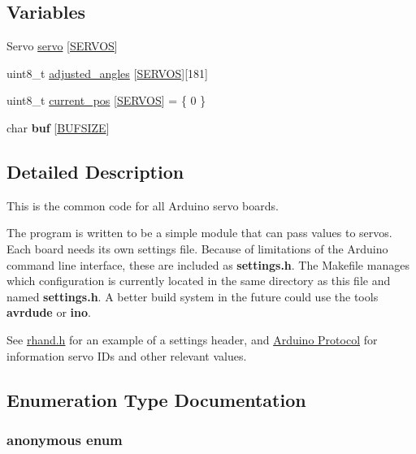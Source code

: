 \subsection*{Variables}
\begin{DoxyCompactItemize}
\item 
Servo \hyperlink{servo_8ino_adf02be48d17da3f4a229ebfdfda2fa71}{servo} \mbox{[}\hyperlink{rhand_8h_a7baed4559391f95790fea2b456a22b68}{S\+E\+R\+V\+O\+S}\mbox{]}
\item 
uint8\+\_\+t \hyperlink{servo_8ino_afb7b19d5ec5c1046df4a261ca4ee9f70}{adjusted\+\_\+angles} \mbox{[}\hyperlink{rhand_8h_a7baed4559391f95790fea2b456a22b68}{S\+E\+R\+V\+O\+S}\mbox{]}\mbox{[}181\mbox{]}
\item 
uint8\+\_\+t \hyperlink{servo_8ino_ae88c6e452cc6a2dc7af59897c42d8e1e}{current\+\_\+pos} \mbox{[}\hyperlink{rhand_8h_a7baed4559391f95790fea2b456a22b68}{S\+E\+R\+V\+O\+S}\mbox{]} = \{ 0 \}
\item 
\hypertarget{servo_8ino_ac95651d79c608a3148973b5b1fc9e525}{}char {\bfseries buf} \mbox{[}\hyperlink{rhand_8h_aeca034f67218340ecb2261a22c2f3dcd}{B\+U\+F\+S\+I\+Z\+E}\mbox{]}\label{servo_8ino_ac95651d79c608a3148973b5b1fc9e525}

\end{DoxyCompactItemize}


\subsection{Detailed Description}
This is the common code for all Arduino servo boards.

The program is written to be a simple module that can pass values to servos. Each board needs its own settings file. Because of limitations of the Arduino command line interface, these are included as {\bfseries settings.\+h}. The Makefile manages which configuration is currently located in the same directory as this file and named {\bfseries settings.\+h}. A better build system in the future could use the tools {\bfseries avrdude} or {\bfseries ino}.

See \hyperlink{rhand_8h}{rhand.\+h} for an example of a settings header, and \hyperlink{index_Arduino}{Arduino Protocol} for information servo I\+Ds and other relevant values. 

\subsection{Enumeration Type Documentation}
\hypertarget{servo_8ino_a06fc87d81c62e9abb8790b6e5713c55b}{}\subsubsection[{anonymous enum}]{\setlength{\rightskip}{0pt plus 5cm}anonymous enum}\label{servo_8ino_a06fc87d81c62e9abb8790b6e5713c55b}


